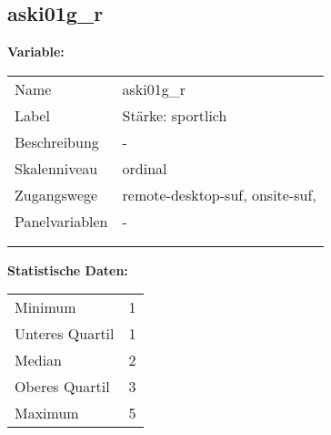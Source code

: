 	
	
	\subsection{aski01g\_r}
	\label{subSection:aski01g_r}

	\noindent\textbf{Variable:}\\
		\begin{tabular}{lL{11.3cm}}
			\label{tableVariable:aski01g_r}
			Name & aski01g\_r \\
			Label & Stärke: sportlich \\
			Beschreibung & - \\
			Skalenniveau & ordinal \\
			Zugangswege &
				remote-desktop-suf,
				onsite-suf,
 \\
			Panelvariablen & -
			 \\
			 \\
 \\
		\end{tabular}



		\vspace*{1 cm}
		\noindent\textbf{Statistische Daten:}\\
			\begin{tabular}{ll}
				\label{tableStatistics:aski01g_r}
					Minimum & 1 \\
					Unteres Quartil & 1 \\
					Median & 2 \\
					Oberes Quartil & 3 \\
					Maximum & 5 \\
			\end{tabular}



